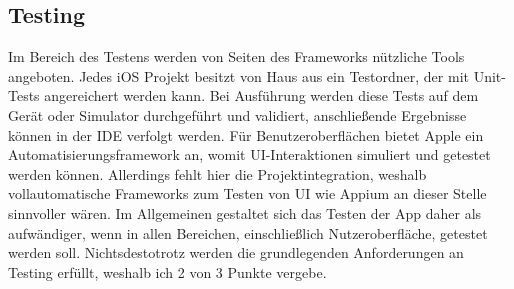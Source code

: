 \subsection{Testing}
Im Bereich des Testens werden von Seiten des Frameworks nützliche Tools angeboten. Jedes iOS Projekt besitzt von Haus aus ein Testordner, der mit Unit-Tests angereichert werden kann. Bei Ausführung werden diese Tests auf dem Gerät oder Simulator durchgeführt und validiert, anschließende Ergebnisse können in der IDE verfolgt werden. Für Benutzeroberflächen bietet Apple ein Automatisierungsframework an, womit UI-Interaktionen simuliert und getestet werden können. Allerdings fehlt hier die Projektintegration, weshalb vollautomatische Frameworks zum Testen von UI wie Appium an dieser Stelle sinnvoller wären. Im Allgemeinen gestaltet sich das Testen der App daher als aufwändiger, wenn in allen Bereichen, einschließlich Nutzeroberfläche, getestet werden soll. Nichtsdestotrotz werden die grundlegenden Anforderungen an Testing erfüllt, weshalb ich 2 von 3 Punkte vergebe.